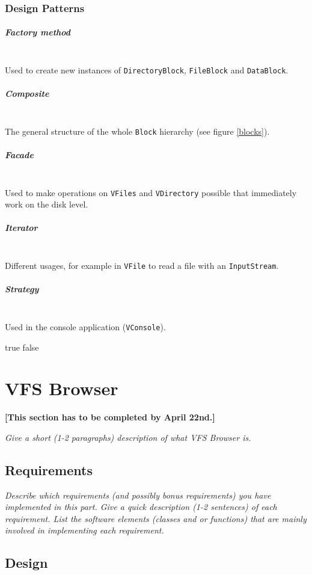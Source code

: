 \documentclass[a4paper,12pt]{article}
\begin{document}
\subsubsection{Design Patterns}
\subparagraph{Factory method} \hfill\\
Used to create new instances of \texttt{DirectoryBlock}, \texttt{FileBlock} and \texttt{DataBlock}.

\subparagraph{Composite} \hfill\\
The general structure of the whole \texttt{Block} hierarchy (see figure \ref{blocks}).

\subparagraph{Facade} \hfill\\
Used to make operations on \texttt{VFiles} and \texttt{VDirectory} possible that immediately work on the disk level.

\subparagraph{Iterator} \hfill\\
Different usages, for example in \texttt{VFile} to read a file with an \texttt{InputStream}.

\subparagraph{Strategy} \hfill\\
Used in the console application (\texttt{VConsole}).


\ifx true false



\section{VFS Browser}

\textbf{[This section has to be completed by April 22nd.]}

\emph{Give a short (1-2 paragraphs) description of what VFS Browser is.}


\subsection{Requirements}

\emph{Describe which requirements (and possibly bonus requirements) you have implemented in this part. Give a quick description (1-2 sentences) of each requirement. List the software elements (classes and or functions) that are mainly involved in implementing each requirement.}


\subsection{Design}
\end{document}
